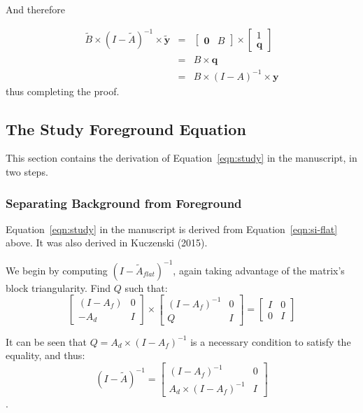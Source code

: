 And therefore

\begin{eqnarray}
  \tilde{B}\times(I-\tilde{A})^{-1}\times\tilde{\mathbf{y}} &=& \left[\begin{array}{cc}\mathbf{0}&B\end{array}\right]\times\left[\begin{array}{c}
      1\\
      \mathbf{q}
    \end{array}\right]\\
   &=&B\times\mathbf{q}\\
   &=&B\times(I-A)^{-1}\times\mathbf{y}
\end{eqnarray}
thus completing the proof.

\subsection{The Study Foreground Equation}

This section contains the derivation of Equation~\ref{eqn:study} in the manuscript, in two steps.



\subsubsection{Separating Background from Foreground}
  
Equation~\ref{eqn:study} in the manuscript is derived from Equation~\ref{eqn:si-flat} above.  It was also derived in Kuczenski (2015).

We begin by computing $(I-\tilde{A}_{flat})^{-1}$, again taking advantage of the matrix's block triangularity.  Find $Q$ such that:
\begin{equation}
  \left[\begin{array}{cc} (I-A_f) & 0 \\ -A_d & I\end{array}\right]\times
  \left[\begin{array}{cc} (I-A_f)^{-1} & 0 \\ Q & I\end{array}\right] =
  \left[\begin{array}{cc} I & 0 \\ 0 & I\end{array}\right]
\end{equation}

It can be seen that $Q=A_d\times(I-A_f)^{-1}$ is a necessary condition to satisfy the equality, and thus:
\begin{equation}
  (I-\tilde{A})^{-1} = \left[\begin{array}{cc} (I-A_f)^{-1} & 0 \\ A_d\times(I-A_f)^{-1} & I\end{array}\right]
\end{equation}.

